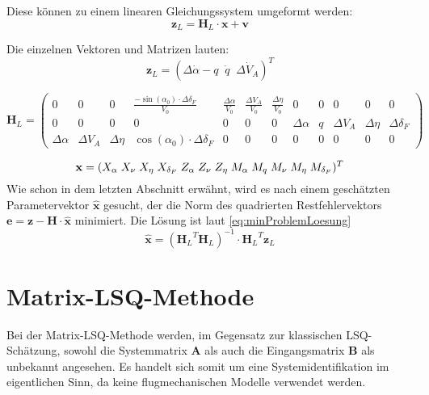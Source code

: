 Diese können zu einem linearen Gleichungssystem umgeformt werden: 
\begin{equation}
    \mathbf{z}_{L}= \mathbf{H}_{L}\cdot \mathbf{x} + \mathbf{v}
\end{equation}

Die einzelnen Vektoren und Matrizen lauten:
\setcounter{MaxMatrixCols}{15}
\begin{equation}
	\mathbf{z}_{L} = (\Delta\dot \alpha-q \;\; \dot q \;\; \Delta\dot V_A)^T
\end{equation}

\begin{equation}
	 \mathbf{H}_{L} = \begin{pmatrix}
		0&0&0& \frac{-\sin{(\alpha_0)}\cdot\Delta\delta_F}{V_0} & \frac{\Delta\alpha}{V_0}& \frac{\Delta V_A}{V_0} & 
		\frac{\Delta\eta}{V_0} &0&0&0&0&0   \\
		0&0&0&0&0&0&0 &\Delta\alpha & q & \Delta V_A & \Delta\eta & \Delta\delta_F \\
		\Delta\alpha &  \Delta V_A & \Delta\eta & \cos{(\alpha_0)}\cdot\Delta\delta_F &0&0&0&0&0&0&0&0 
	\end{pmatrix}
\end{equation}

\begin{equation}
	\mathbf{x} = (X_{\alpha}\; 
	X_{\nu}\;
	X_{\eta}\;
	X_{\delta_F}\; 
	Z_{\alpha}\; 
	Z_{\nu}\;
	Z_{\eta}\;
	M_{\alpha}\;
	M_{q}\;
	M_{\nu}\;
	M_{\eta}\;
	M_{\delta_F})^T \\
\end{equation}  
Wie schon in dem letzten Abschnitt erwähnt, wird es nach einem geschätzten 
Parametervektor $\mathbf{\hat{x}}$ gesucht, der 
die Norm des quadrierten Restfehlervektors $ \mathbf{e} = \mathbf{z} - \mathbf{H}\cdot \mathbf{\hat{x}}$ minimiert. Die 
Lösung ist laut \cref{eq:minProblemLoesung}
\begin{equation}
    \hat{\mathbf{x}}= {({\mathbf{H}_L}^{T} {\mathbf{H}_L})}^{-1} \cdot {\mathbf{H}_L}^{T} \mathbf{z}_L 
\end{equation}



\section{Matrix-LSQ-Methode}

Bei der Matrix-LSQ-Methode werden, im Gegensatz zur klassischen LSQ-Schätzung, sowohl die Systemmatrix $ \mathbf{A} $ als 
auch die Eingangsmatrix $ \mathbf{B} $ als unbekannt angesehen. Es handelt sich somit um eine Systemidentifikation im 
eigentlichen Sinn, da keine flugmechanischen Modelle verwendet werden.

